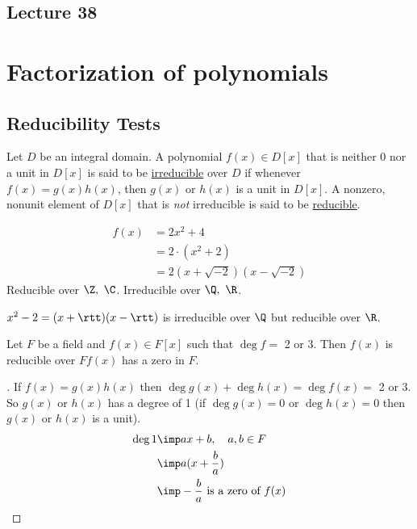 \documentclass[a4paper]{article}
\begin{document}
\subsection*{Lecture 38} %
\section{Factorization of polynomials}
\subsection{Reducibility Tests}
\begin{definition}
  Let \( D \) be an integral domain.
  A polynomial \( f(x)\in D[x] \) that is neither 0 nor a unit in \( D[x] \) is said to be \ul{irreducible} over \( D \) if whenever \( f(x) = g(x)h(x) \), then \( g(x) \) or \( h(x) \) is a unit in \( D[x] \). A nonzero, nonunit element of \( D[x] \) that is \emph{not} irreducible is said to be \ul{reducible}.
\end{definition}

\begin{example}
  \begin{align*}
    f(x) &= 2x^2 + 4 \\ &= 2\cdot (x^2+2) \\ &= 2(x+\sqrt{-2})(x-\sqrt{-2})
  \end{align*}
  Reducible over \( \Z,\ \C \). Irreducible over \( \Q,\ \R \).
\end{example}

\begin{example}
  \( x^2-2 = (x+\rtt)(x-\rtt) \) is irreducible over \( \Q \) but reducible over \( \R \).
\end{example}

\begin{theorem}
  Let \( F \) be a field and \( f(x) \in F[x] \) such that \( \deg f =\) 2 or 3.
  Then \( f(x) \) is reducible over \( F \)\iff \( f(x) \) has a zero in \( F \).
\end{theorem}

\begin{proof}[]
  If \( f(x) = g(x)h(x) \) then \( \deg g(x) + \deg h(x) = \deg f(x) = \) 2 or 3.
  So \( g(x) \) or \( h(x) \) has a degree of 1 (if \( \deg g(x) = 0 \) or \( \deg h(x) = 0 \) then \( g(x) \) or \( h(x) \) is a unit).
  \begin{align*}
    \deg 1 &\imp ax+b,\quad a,b\in F \\
           &\imp a(x+\frac{b}{a}) \\
           &\imp -\frac{b}{a} \text{ is a zero of } f(x)
  \end{align*}
\end{proof}
\end{document}
